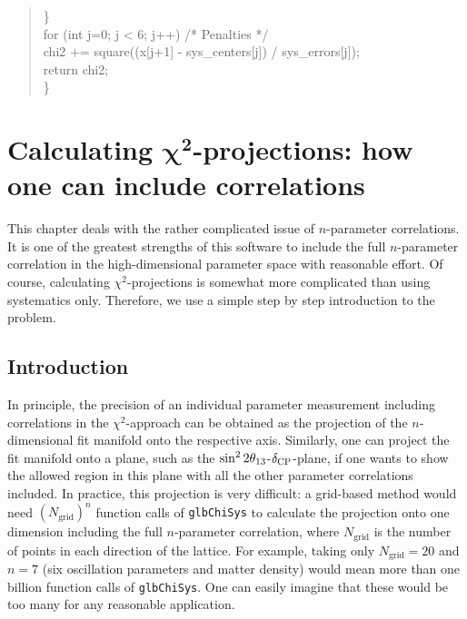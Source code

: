 {\begin{quote}
{\hspace*{0.5 cm}      \}                                                        \\
\hspace*{0.5 cm}      for (int j=0; j < 6; j++)  /* Penalties */                \\
\hspace*{1.0 cm}        chi2 += square((x[j+1] - sys\_centers[j]) / sys\_errors[j]);\\
\hspace*{0.5 cm}      return chi2;                                              \\
  \}                                                                            
}
\end{quote}
}


\chapter[Calculating $\chi^2$-projections: how one can include correlations]{Calculating $\boldsymbol{\chi^2}$-projections: how one can include correlations}
\label{chapt:correlations}

This chapter deals with the rather complicated issue of $n$-parameter correlations. It is one of the greatest strengths of this software 
to include the full $n$-parameter correlation in the high-dimensional parameter space with reasonable effort. Of course, calculating $\chi^2$-projections is somewhat more complicated than using systematics only. Therefore, we use a simple step by step introduction to the problem. 

\section{Introduction}

In principle, the precision of an individual parameter measurement including
 correlations in the $\chi^2$-approach can be obtained as the projection of 
the $n$-dimensional fit manifold onto the respective axis. Similarly, one can 
project the fit manifold onto a plane, such as the $\sin^2 2 \theta_{13}$-$\delta_{\mathrm{CP}}$-plane,
 if one wants to show the allowed
region in this plane with all the other parameter correlations included. 
In practice, this projection is very difficult: a grid-based method would 
need $(N_{\mathrm{grid}})^n$ function calls of {\tt glbChiSys} to 
calculate the projection onto one dimension 
including the full $n$-parameter correlation, where 
$N_{\mathrm{grid}}$ is the number of points in each direction of the 
lattice. For example, taking only $N_{\mathrm{grid}}=20$ and 
$n=7$ (six oscillation parameters and matter density) would mean more 
than one billion function calls of {\tt glbChiSys}. One can easily imagine 
that these would be too many for any reasonable application.

